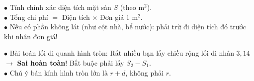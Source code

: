 \documentclass[14pt,a4paper,oneside]{extbook}
\begin{document}
\vspace{3mm}

\noindent
\begin{minipage}[t]{0.54\textwidth}
  \begin{tcolorbox}[
    enhanced,
    title={\footnotesize\bfseries\color{white}\faMoney\ Tính chi phí trồng cỏ / lát gạch},
    colback=green!3!white,
    colframe=green!60!black,
    arc=2.5mm, boxrule=0.8pt, top=1.8mm, bottom=1.8mm, left=2.2mm, right=2.2mm
  ]
    \footnotesize
    $\bullet$ Tính chính xác diện tích mặt sàn $S$ (theo $\text{m}^2$).\\
    $\bullet$ Tổng chi phí $=$ Diện tích $\times$ Đơn giá $1\text{ m}^2$.\\
    $\bullet$ Nếu có phần không lát (như cột nhà, bể nước): phải trừ đi diện tích đó trước khi nhân đơn giá!
  \end{tcolorbox}
\end{minipage}%
\hfill
\begin{minipage}[t]{0.44\textwidth}
  \begin{tcolorbox}[
    enhanced,
    title={\footnotesize\bfseries\color{white}\faExclamationTriangle\ Mẹo tránh bẫy trắc nghiệm},
    colback=red!2!white,
    colframe=red!70!black,
    arc=2.5mm, boxrule=0.8pt, top=1.8mm, bottom=1.8mm, left=2.2mm, right=2.2mm
  ]
    \footnotesize
    $\bullet$ Bài toán lối đi quanh hình tròn: Rất nhiều bạn lấy chiều rộng lối đi nhân $3,14$ $\rightarrow$ \textbf{Sai hoàn toàn}! Bắt buộc phải lấy $S_2 - S_1$.\\
    $\bullet$ Chú ý bán kính hình tròn lớn là $r + d$, không phải $r$.
  \end{tcolorbox}
\end{minipage}
\end{document}
